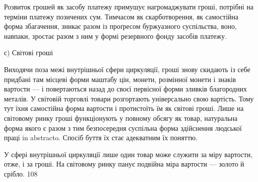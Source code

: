 Розвиток грошей як засобу платежу примушує нагромаджувати
гроші, потрібні на терміни платежу позичених сум. Тимчасом
як скарботворення, як самостійна форма збагачення, зникає
разом із проґресом буржуазного суспільства, воно, навпаки,
зростає разом з ним у формі резервного фонду засобів платежу.

с) Світові гроші

Виходячи поза межі внутрішньої сфери циркуляції, гроші
знову скидають із себе придбані там місцеві форми маштабу
цін, монети, розмінної монети і знаків вартости — і повертаються
назад до своєї первісної форми зливків благородних
металів. У світовій торговлі товари розгортають універсально
свою вартість. Тому тут їхня самостійна форма вартости і протистоїть
їм як світові гроші. Лише на світовому ринку гроші функціонують
у повному обсягу як товар, натуральна форма якого
є разом з тим безпосередня суспільна форма здійснення людської
праці in abstracto. Спосіб буття їх стає адекватним їх поняттю.

У сфері внутрішньої циркуляції лише один товар може служити
за міру вартости, отже, і за гроші. На світовому ринку
панує подвійна міра вартости — золото й срібло. 108

